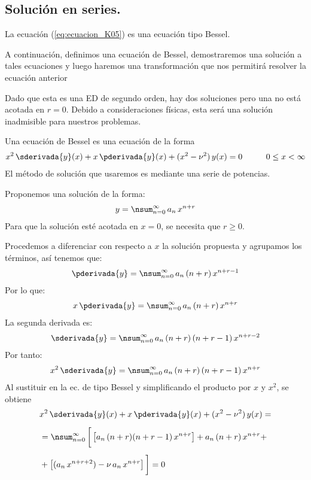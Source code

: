 \subsection{Solución en series.}

La ecuación (\ref{eq:ecuacion_K05}) es una ecuación tipo Bessel.
\par
A continuación, definimos una ecuación de Bessel, demostraremos una solución a tales ecuaciones y luego haremos una transformación que nos permitirá resolver la ecuación anterior
\par
Dado que esta es una ED de segundo orden, hay dos soluciones pero una no está acotada en $r = 0$. Debido a consideraciones físicas, esta será una solución inadmisible para nuestros problemas.
\par
Una ecuación de Bessel es una ecuación de la forma
\begin{align*}
x^{2} \, \sderivada{y} (x) + x \,\pderivada{y} (x) + (x^{2} - \nu^{2}) \, y (x) = 0 \hspace{1cm} 0 \leq x < \infty
\end{align*}
El método de solución que usaremos es mediante una serie de potencias.
\par
Proponemos una solución de la forma:
\begin{align*}
y = \nsum_{n=0}^{\infty} \, a_{n} \, x^{n+r}
\end{align*}
Para que la solución esté acotada en $x = 0$, se necesita que $r \geq 0$.
\par
Procedemos a diferenciar con respecto a $x$ la solución propuesta y agrupamos los términos, así tenemos que:
\begin{align*}
\pderivada{y} = \nsum_{n=0}^{\infty} \, a_{n} \, (n + r) \, x^{n+r-1}
\end{align*}
Por lo que:
\begin{align*}
x \, \pderivada{y} = \nsum_{n=0}^{\infty} \, a_{n} \, (n + r) \, x^{n+r}
\end{align*}
La segunda derivada es:
\begin{align*}
\sderivada{y} = \nsum_{n=0}^{\infty} \, a_{n} \, (n + r) \, (n + r - 1) \, x^{n+r-2}
\end{align*}
Por tanto:
\begin{align*}
x^{2} \, \sderivada{y} = \nsum_{n=0}^{\infty} \, a_{n} \, (n + r) \, (n + r - 1) \, x^{n+r}
\end{align*}
Al sustituir en la ec. de tipo Bessel y simplificando el producto por $x$ y $x^{2}$, se obtiene
\begin{align*}
&x^{2} \, \sderivada{y} (x) + x \,\pderivada{y} (x) + (x^{2} - \nu^{2}) \, y(x) = \\[0.5em]
&= \nsum_{n=0}^{\infty} \, \bigg[ \left[ a_{n} \, (n + r) (n + r -1) \, x^{n+r} \right] + a_{n} \, (n + r) \, x^{n+r} + \\[0.5em]
&+ \left[ (a_{n} \, x^{n+r+2} ) - \nu \, a_{n} \, x^{n+r} \right] \bigg] = 0
\end{align*}
